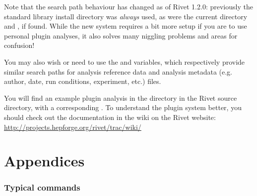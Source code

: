 \documentclass{JHEP3}
\begin{document}
\begin{change}
  Note that the search path behaviour has changed as of Rivet 1.2.0: previously
  the standard library install directory was \emph{always} used, as were the
  current directory and , if found. While the new system requires a
  bit more setup if you are to use personal plugin analyses, it also solves many
  niggling problems and areas for confusion!
\end{change}

You may also wish or need to use the  and
 variables, which respectively provide similar search paths
for analysis reference data and analysis metadata (e.g. author, date, run
conditions, experiment, etc.) files.

You will find an example plugin analysis in the  directory in
the Rivet source directory, with a corresponding . To understand
the plugin system better, you should check out the documentation in the wiki on
the Rivet website: \url{http://projects.hepforge.org/rivet/trac/wiki/}


% 
% 
% 



\cleardoublepage
\part{Appendices}
\appendix


\section{Typical  commands}
\label{app:agilerunmc}
\end{document}
